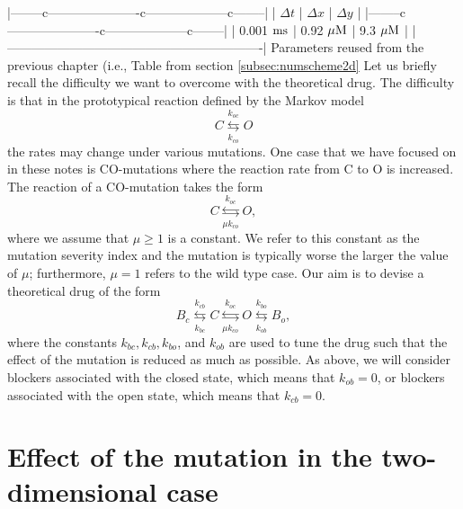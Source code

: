 {|--------c----------------------c--------------------c--------|
| $\Delta t$       | $\Delta x$         | $\Delta y$          |
|--------c----------------------c--------------------c--------|
| 0.001 $\rm{ms}$  | 0.92 $\rm{\mu M}$  | 9.3 $\rm{\mu M}$    |
|-------------------------------------------------------------|
Parameters reused from the previous chapter (i.e., Table from section \ref{subsec:numscheme2d} %
Let us briefly recall the difficulty we want to overcome with the
theoretical drug. The difficulty is that in the prototypical reaction
defined by the Markov model
\[
C\underset{k_{co}}{\overset{k_{oc}}{\leftrightarrows}}O
\]
the rates may change under various mutations. One case that we have focused on 
in these notes is CO-mutations where the reaction rate from C to O is increased.
The reaction of a CO-mutation takes the form
\[
C\underset{ \mu k_{co}}{\overset{k_{oc}}{\leftrightarrows}}O,
\]
where we assume that $\mu\geqslant1$ is a constant. We refer to this constant
as the mutation severity index and the mutation is typically worse the larger
the value of $\mu$; furthermore, $\mu=1$ refers to the wild type case.
Our aim is to devise a theoretical drug of the form 
\[
B_c\underset{k_{bc}}{\overset{k_{cb}}{\leftrightarrows}}C\underset{\mu k_{co}
}{\overset{k_{oc}}{\leftrightarrows}}O\underset{k_{ob}}{\overset{k_{bo}}{\leftrightarrows}}B_o,
\]
where the constants $k_{bc}, k_{cb}, k_{bo}$, and $k_{ob}$ are used to tune the drug such 
that the effect of the mutation is reduced as much as possible. As above, we will consider blockers associated with
the closed state, which means that $k_{ob}=0$, or blockers associated with the open state, which means that $k_{cb}=0$.



\section[Effect of the mutation in 2D]{Effect of the mutation in the two-dimensional case}
\label{effmutation2d}

}
